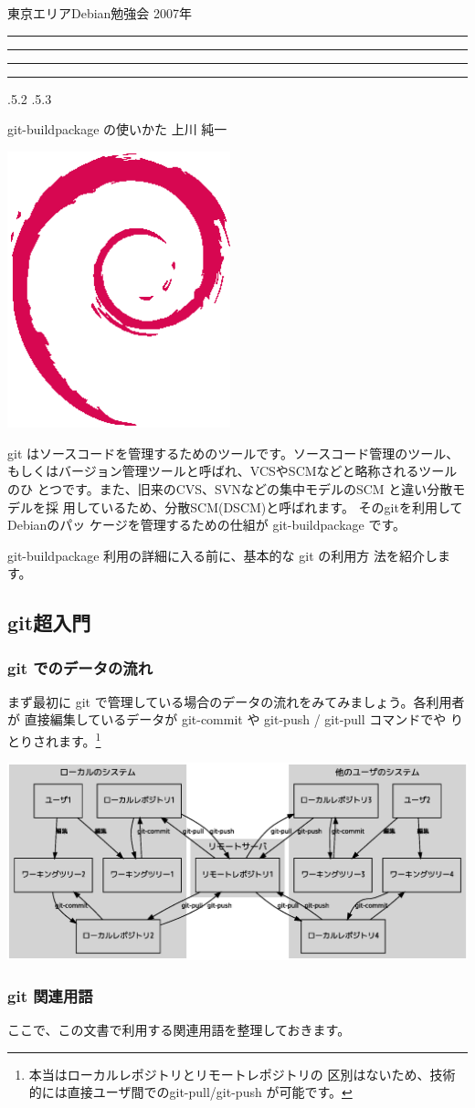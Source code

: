 \documentclass[mingoth,a4paper]{jsarticle}
\makeatletter
\newcommand{\debmtgyear}{2007}
\renewcommand{\section}{\@startsection{section}{1}{\z@}%
    {\Cvs \@plus.5\Cdp \@minus.2\Cdp}%
    {.5\Cvs \@plus.3\Cdp}%
    {\normalfont\Huge\headfont\raggedright\centering}} %
\newcommand{\dancersection}[2]{%
\newpage
東京エリアDebian勉強会 \debmtgyear{}年
\hrule
\vspace{0.5mm}
\hrule
%
\vspace{4cm}
\hrule
\vspace{0.5mm}
\hrule
%
\vspace{-7cm}
\begin{minipage}[b]{0.7\hsize}
\section{#1}
\hfill{}#2\\
\vspace{2cm}
\end{minipage}
\begin{minipage}[b]{0.3\hsize}
\hfill{}\includegraphics[height=8cm]{image200502/openlogo-nd.eps}\\
\end{minipage}
%
\vspace{-1cm}
}
\makeatother
\begin{document}
\dancersection{git-buildpackage の使いかた}{上川 純一}
\label{sec:git}

git はソースコードを管理するためのツールです。ソースコード管理のツール、
もしくはバージョン管理ツールと呼ばれ、VCSやSCMなどと略称されるツールのひ
とつです。また、旧来のCVS、SVNなどの集中モデルのSCM と違い分散モデルを採
用しているため、分散SCM(DSCM)と呼ばれます。 そのgitを利用してDebianのパッ
ケージを管理するための仕組が git-buildpackage です。

git-buildpackage 利用の詳細に入る前に、基本的な git の利用方
法を紹介します。

\subsection{git超入門}

\subsubsection{git でのデータの流れ}

まず最初に git で管理している場合のデータの流れをみてみましょう。各利用者が
直接編集しているデータが git-commit や git-push / git-pull コマンドでや
りとりされます。\footnote{本当はローカルレポジトリとリモートレポジトリの
区別はないため、技術的には直接ユーザ間でのgit-pull/git-push が可能です。}

\includegraphics[width=0.8\hsize]{image200704/git-repos.eps}

\subsubsection{git 関連用語}

ここで、この文書で利用する関連用語を整理しておきます。
\end{document}
